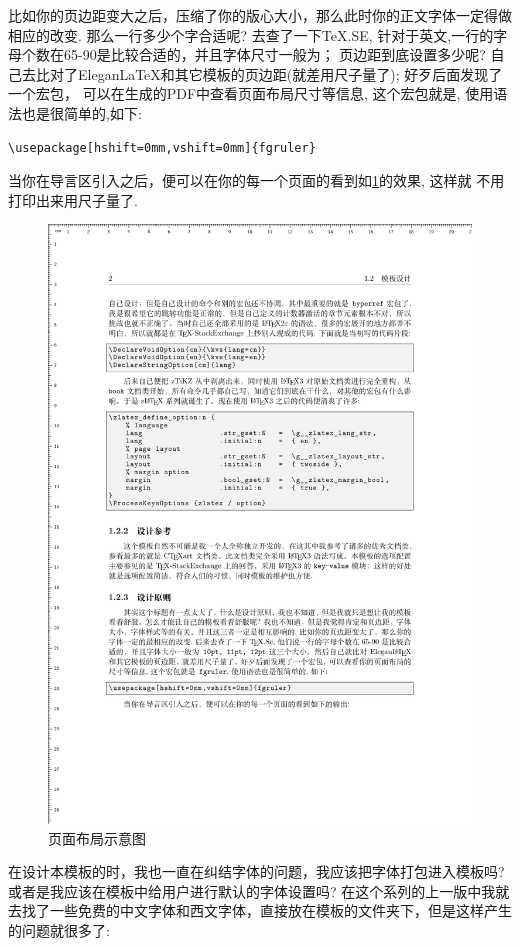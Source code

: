 比如你的页边距变大之后，压缩了你的版心大小，那么此时你的正文字体一定得做相应的改变. 那么一行多少个字合适呢?
去查了一下\TeX.SE, 针对于英文,一行的字母个数在65-90是比较合适的，并且字体尺寸一般为\cmd{10pt,11pt,12pt}；
页边距到底设置多少呢? 自己去比对了Elegan\LaTeX{}和其它模板的页边距(就差用尺子量了); 好歹后面发现了一个宏包，
可以在生成的PDF中查看页面布局尺寸等信息, 这个宏包就是, 使用语法也是很简单的,如下:

\begin{verbatim}
\usepackage[hshift=0mm,vshift=0mm]{fgruler}
\end{verbatim}

当你在导言区引入之后，便可以在你的每一个页面的看到如\cref{fig:fgruler-example}的效果, 这样就 
不用打印出来用尺子量了.

\begin{figure}[!htb]
    \centering
    \includegraphics[width=.75\linewidth]{./pics/fgruler_example.pdf}
    \caption{页面布局示意图}
    \label{fig:fgruler-example}
\end{figure}

在设计本模板的时，我也一直在纠结字体的问题，我应该把字体打包进入模板吗? 或者是我应该在模板中给用户进行默认的字体设置吗?
在这个系列的上一版中我就去找了一些免费的中文字体和西文字体，直接放在模板的文件夹下，但是这样产生的问题就很多了:


